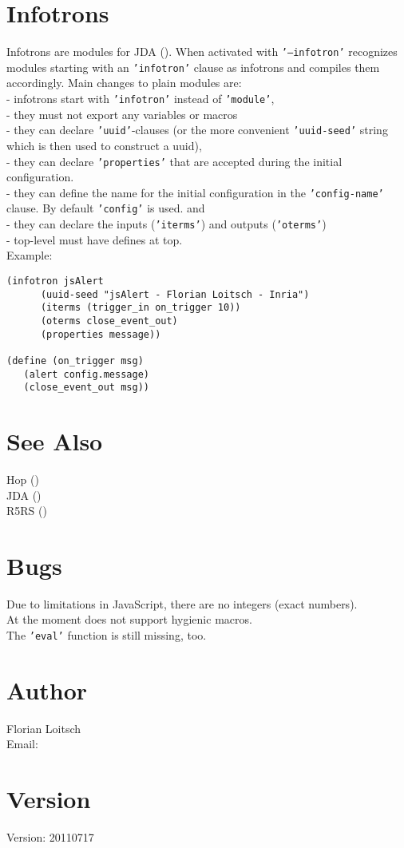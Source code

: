 \section{Infotrons}
Infotrons are modules for JDA ().
When activated with \texttt{'--infotron'}  recognizes modules starting
with an \texttt{'infotron'} clause as infotrons and compiles them accordingly.
Main changes to plain modules are:\\
- infotrons start with \texttt{'infotron'} instead of \texttt{'module'},\\
- they must not export any variables or macros\\
- they can declare \texttt{'uuid'}-clauses (or the more convenient
\texttt{'uuid-seed'} string which is then used to construct a uuid),\\
- they can declare \texttt{'properties'} that are accepted during the initial
   configuration.\\
- they can define the name for the initial configuration in the
\texttt{'config-name'} clause. By default \texttt{'config'} is used. and\\
- they can declare the inputs (\texttt{'iterms'}) and outputs (\texttt{'oterms'})\\
- top-level must have defines at top.\\
Example:\\
\begin{verbatim}
(infotron jsAlert
	  (uuid-seed "jsAlert - Florian Loitsch - Inria")
	  (iterms (trigger_in on_trigger 10))
	  (oterms close_event_out)
	  (properties message))

(define (on_trigger msg)
   (alert config.message)
   (close_event_out msg))
\end{verbatim}
\section{See Also}
Hop ()\\
JDA ()\\
R5RS ()
\section{Bugs}
Due to limitations in JavaScript, there are no integers (exact numbers).\\
At the moment  does not support hygienic macros.\\
The \texttt{'eval'} function is still missing, too.\\

\section{Author}
Florian Loitsch\\
Email: 
\section{Version}
Version: 20110717